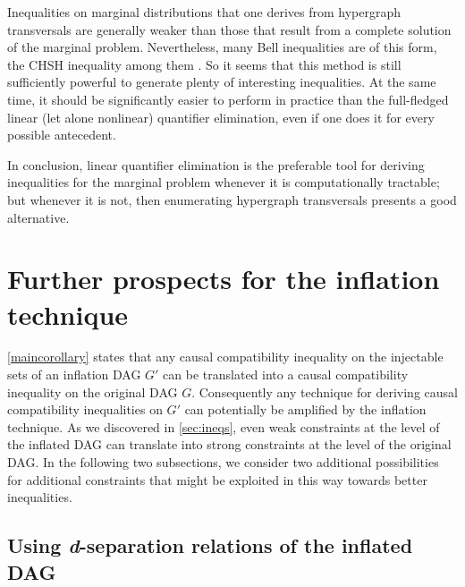 {Inequalities on marginal distributions that one derives from hypergraph transversals are generally weaker than those that result from a complete solution of the marginal problem. Nevertheless, many Bell inequalities are of this form, the CHSH inequality among them \cite{Ghirardi08}.  So it seems that this method is still sufficiently powerful to generate plenty of interesting inequalities. At the same time, it should be significantly easier to perform in practice than the full-fledged linear (let alone nonlinear) quantifier elimination, even if one does it for every possible antecedent.

In conclusion, linear quantifier elimination is the preferable tool for deriving inequalities for the marginal problem whenever it is computationally tractable; but whenever it is not, then enumerating hypergraph transversals presents a good alternative. %





\section{Further prospects for the inflation technique}\label{sec:otherprospects}

\cref{maincorollary} states that any causal compatibility inequality on the injectable sets of an inflation DAG $G'$ can be translated into a causal compatibility inequality on the original DAG $G$. Consequently any technique for deriving causal compatibility inequalities on $G'$ can potentially be amplified by the inflation technique.  As we discovered in \cref{sec:ineqs}, even weak constraints at the level of the inflated DAG can translate into strong constraints at the level of the original DAG. In the following two subsections, we consider two additional possibilities for additional constraints that might be exploited in this way towards better inequalities.

\subsection{Using \textit{d}-separation relations of the inflated DAG}\label{sec:fulldsep}

}
